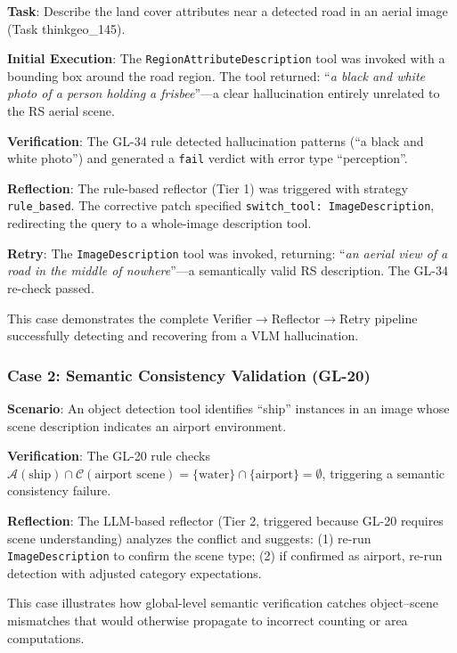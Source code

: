 \documentclass[journal]{IEEEtran}
\begin{document}
\textbf{Task}: Describe the land cover attributes near a detected road in an aerial image (Task thinkgeo\_145).

\textbf{Initial Execution}: The \texttt{RegionAttributeDescription} tool was invoked with a bounding box around the road region. The tool returned: ``\textit{a black and white photo of a person holding a frisbee}''---a clear hallucination entirely unrelated to the RS aerial scene.

\textbf{Verification}: The GL-34 rule detected hallucination patterns (``a black and white photo'') and generated a \texttt{fail} verdict with error type ``perception''.

\textbf{Reflection}: The rule-based reflector (Tier 1) was triggered with strategy \texttt{rule\_based}. The corrective patch specified \texttt{switch\_tool: ImageDescription}, redirecting the query to a whole-image description tool.

\textbf{Retry}: The \texttt{ImageDescription} tool was invoked, returning: ``\textit{an aerial view of a road in the middle of nowhere}''---a semantically valid RS description. The GL-34 re-check passed.

This case demonstrates the complete Verifier$\rightarrow$Reflector$\rightarrow$Retry pipeline successfully detecting and recovering from a VLM hallucination.

\subsubsection{Case 2: Semantic Consistency Validation (GL-20)}

\textbf{Scenario}: An object detection tool identifies ``ship'' instances in an image whose scene description indicates an airport environment.

\textbf{Verification}: The GL-20 rule checks $\mathcal{A}(\text{ship}) \cap \mathcal{C}(\text{airport scene}) = \{\text{water}\} \cap \{\text{airport}\} = \emptyset$, triggering a semantic consistency failure.

\textbf{Reflection}: The LLM-based reflector (Tier 2, triggered because GL-20 requires scene understanding) analyzes the conflict and suggests: (1) re-run \texttt{ImageDescription} to confirm the scene type; (2) if confirmed as airport, re-run detection with adjusted category expectations.

This case illustrates how global-level semantic verification catches object--scene mismatches that would otherwise propagate to incorrect counting or area computations.
\end{document}
